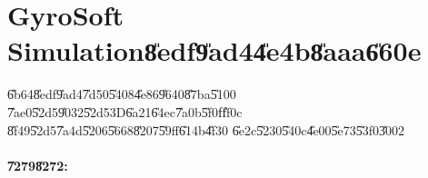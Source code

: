                       

\part{GyroSoft Simulation\U{8edf}\U{9ad4}\U{4e4b}\U{8aaa}\U{660e}}

\setcounter{xpage}{1}

\bigskip

\U{6b64}\U{8edf}\U{9ad4}\U{7d50}\U{5408}\U{4e86}\U{9640}\U{87ba}\U{5100}%
\U{7ae0}\U{52d5}\U{9032}\U{52d5}3D\U{6a21}\U{64ec}\U{7a0b}\U{5f0f}\U{ff0c}%
\U{8f49}\U{52d5}\U{7a4d}\U{5206}\U{5668}\U{8207}\U{59ff}\U{614b}\U{4f30}%
\U{6e2c}\U{5230}\U{540c}\U{4e00}\U{5e73}\U{53f0}\U{3002}

\subsection{\U{7279}\U{8272}:}

